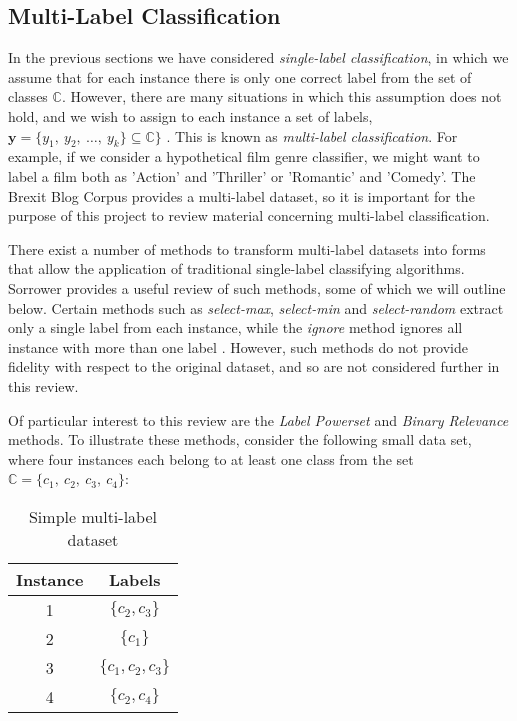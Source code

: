 \documentclass[Dissertation.tex]{subfiles}
\begin{document}
\subsection{Multi-Label Classification}
In the previous sections we have considered \textit{single-label classification}, in which we assume  that for each instance there is only one correct label from the set of classes $ \mathbb{C} $. However, there are many situations in which this assumption does not hold, and we wish to assign to each instance a set of labels, $ \mathbf{y} = \{y_1,\ y_2,\  \dots, \ y_k\} \subseteq \mathbb{C}\} $ \cite{tsoumakasMiningMultilabelData2009}. This is known as \textit{multi-label classification}. For example, if we consider a hypothetical film genre classifier, we might want to label a film both as 'Action' and 'Thriller' or 'Romantic' and 'Comedy'. The Brexit Blog Corpus \cite{simakiAnnotatingSpeakerStance2017} provides a multi-label dataset, so it is important for the purpose of this project to review material concerning multi-label classification.

There exist a number of methods to transform multi-label datasets into forms that allow the application of traditional single-label classifying algorithms. Sorrower \cite{sorowerLiteratureSurveyAlgorithms2018} provides a useful review of such methods, some of which we will outline below. Certain methods such as \textit{select-max}, \textit{select-min} and \textit{select-random} extract only a single label from each instance, while the \textit{ignore} method ignores all instance with more than one label \cite{sorowerLiteratureSurveyAlgorithms2018}. However, such methods do not provide fidelity with respect to the original dataset, and so are not considered further in this review. 

Of particular interest to this review are the \textit{Label Powerset} and \textit{Binary Relevance} methods. To illustrate these methods, consider the following small data set, where four instances each belong to at least one class from the set $\mathbb{C} = \{c_1, \ c_2, \ c_3, \ c_4\}$:

\begin{table}[]
	\centering
	\caption{Simple multi-label dataset}	
		\begin{tabular}{@{}cc@{}}

		\toprule
		Instance & Labels \\ \midrule
		1	&	$ \{c_2,c_3\} $        \\
		2	&	$ \{c_1\} $        \\
		3	&	$ \{c_1,c_2,c_3\} $        \\
		4	&	$ \{c_2, c_4\} $        \\ \bottomrule
	\end{tabular}
	
\end{table}
\end{document}
